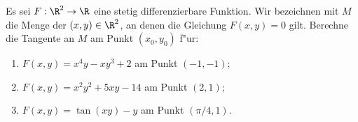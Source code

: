 \begin{prob}
Es sei $F:\R^2\to \R$ eine stetig differenzierbare Funktion. Wir bezeichnen mit $M$ die Menge der $(x,y)\in\R^2$, an denen die Gleichung $F(x,y)=0$ gilt. Berechne die Tangente an $M$ am Punkt $(x_0,y_0)$ f"ur:
\begin{enumerate}[label=(\alph*)]
\item $F(x,y)=x^4y-xy^3+2$ am Punkt $(-1,-1)$;
\item $F(x,y)=x^2y^2+5xy-14$ am Punkt $(2,1)$;
\item $F(x,y)=\tan(xy)-y$ am Punkt $(\pi/4,1)$.
\end{enumerate}
\end{prob}
